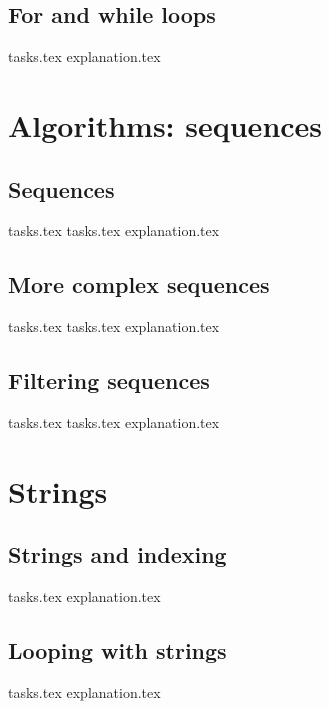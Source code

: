     \section{For and while loops}
    {tasks.tex}         \newpage
    {explanation.tex}      \newpage

    \chapter{Algorithms: sequences}
    \newpage

    \section{Sequences}
    {tasks.tex}            \newpage
    {tasks.tex}         \newpage
    {explanation.tex}      \newpage

    \section{More complex sequences}
    {tasks.tex}        \newpage
    {tasks.tex}     \newpage
    {explanation.tex}  \newpage

    \section{Filtering sequences}
    {tasks.tex}               \newpage
    {tasks.tex}            \newpage
    {explanation.tex}         \newpage

    \chapter{Strings}
    \newpage

    \section{Strings and indexing}
    {tasks.tex}          \newpage
    {explanation.tex}       \newpage

    \section{Looping with strings}
    {tasks.tex}      \newpage
    {explanation.tex}   \newpage


